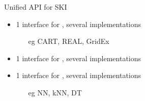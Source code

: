 \documentclass[presentation]{beamer}\mode<presentation>{\usetheme{AMSBolognaFC}}
\begin{document}
\begin{frame}[allowframebreaks]
    \begin{block}{Unified API for SKI}
        \begin{itemize}
            \item 1 interface for , several implementations
            \begin{itemize}
                \item[eg] CART, REAL, GridEx
            \end{itemize}
            \item 1 interface for , several implementations
            \item 1 interface for , several implementations
            \begin{itemize}
                \item[eg] NN, kNN, DT
            \end{itemize}
        \end{itemize}
    \end{block}
\end{frame}
\end{document}
